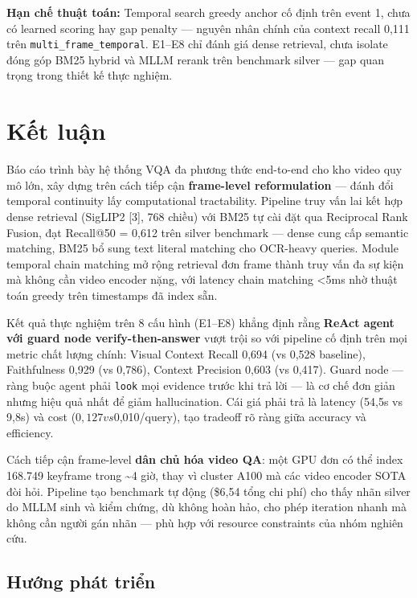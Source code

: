 \documentclass[12pt,a4paper,onecolumn]{article}
\begin{document}
\textbf{Hạn chế thuật toán:} Temporal search greedy anchor cố định trên event 1, chưa có learned scoring hay gap penalty — nguyên nhân chính của context recall 0,111 trên \texttt{multi\_frame\_temporal}. E1–E8 chỉ đánh giá dense retrieval, chưa isolate đóng góp BM25 hybrid và MLLM rerank trên benchmark silver — gap quan trọng trong thiết kế thực nghiệm.

\section{Kết luận}

Báo cáo trình bày hệ thống VQA đa phương thức end-to-end cho kho video quy mô lớn, xây dựng trên cách tiếp cận \textbf{frame-level reformulation} — đánh đổi temporal continuity lấy computational tractability. Pipeline truy vấn lai kết hợp dense retrieval (SigLIP2 [3], 768 chiều) với BM25 tự cài đặt qua Reciprocal Rank Fusion, đạt Recall@50 = 0,612 trên silver benchmark — dense cung cấp semantic matching, BM25 bổ sung text literal matching cho OCR-heavy queries. Module temporal chain matching mở rộng retrieval đơn frame thành truy vấn đa sự kiện mà không cần video encoder nặng, với latency chain matching <5ms nhờ thuật toán greedy trên timestamps đã index sẵn.

Kết quả thực nghiệm trên 8 cấu hình (E1–E8) khẳng định rằng \textbf{ReAct agent với guard node verify-then-answer} vượt trội so với pipeline cố định trên mọi metric chất lượng chính: Visual Context Recall 0,694 (vs 0,528 baseline), Faithfulness 0,929 (vs 0,786), Context Precision 0,603 (vs 0,417). Guard node — ràng buộc agent phải \texttt{look} mọi evidence trước khi trả lời — là cơ chế đơn giản nhưng hiệu quả nhất để giảm hallucination. Cái giá phải trả là latency (54,5s vs 9,8s) và cost ($0,127 vs $0,010/query), tạo tradeoff rõ ràng giữa accuracy và efficiency.

Cách tiếp cận frame-level \textbf{dân chủ hóa video QA}: một GPU đơn có thể index 168.749 keyframe trong \textasciitilde{}4 giờ, thay vì cluster A100 mà các video encoder SOTA đòi hỏi. Pipeline tạo benchmark tự động (\$6,54 tổng chi phí) cho thấy nhãn silver do MLLM sinh và kiểm chứng, dù không hoàn hảo, cho phép iteration nhanh mà không cần người gán nhãn — phù hợp với resource constraints của nhóm nghiên cứu.

\subsection{Hướng phát triển}
\end{document}
